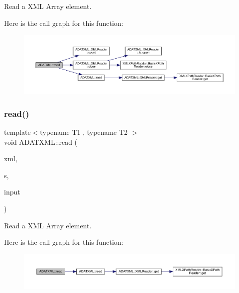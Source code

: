 Read a X\+ML Array element. 

Here is the call graph for this function\+:\nopagebreak
\begin{figure}[H]
\begin{center}
\leavevmode
\includegraphics[width=350pt]{d2/da3/group__io_ga01c7047fcb175e3518660cdab70536c9_cgraph}
\end{center}
\end{figure}
\mbox{\label{group__io_gaa94af0693db4178d032a64ee2d3c5439}} 
\subsubsection{\texorpdfstring{read()}{read()}\hspace{0.1cm}{\footnotesize\ttfamily [52/52]}}
{\footnotesize\ttfamily template$<$typename T1 , typename T2 $>$ \\
void A\+D\+A\+T\+X\+M\+L\+::read (\begin{DoxyParamCaption}\item[{\mbox{\hyperlink{classADATXML_1_1XMLReader}{X\+M\+L\+Reader}} \&}]{xml,  }\item[{const std\+::string \&}]{s,  }\item[{std\+::pair$<$ T1, T2 $>$ \&}]{input }\end{DoxyParamCaption})\hspace{0.3cm}{\ttfamily [inline]}}



Read a X\+ML Array element. 

Here is the call graph for this function\+:\nopagebreak
\begin{figure}[H]
\begin{center}
\leavevmode
\includegraphics[width=350pt]{d2/da3/group__io_gaa94af0693db4178d032a64ee2d3c5439_cgraph}
\end{center}
\end{figure}
\mbox{\label{group__io_gadf35620dfa0c46f11572a9ffb3452847}} 
